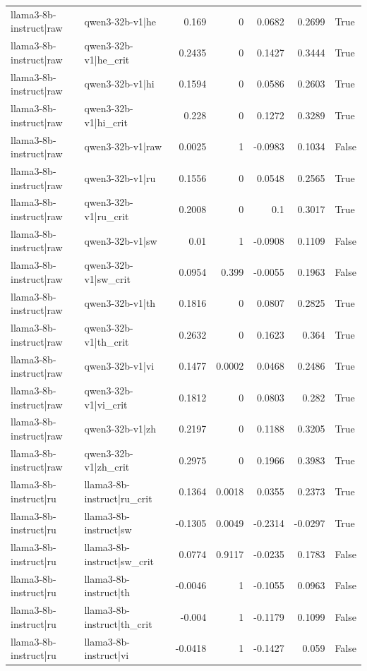\begin{table}
\begin{tabular}{l l r r r r l}
llama3-8b-instruct|raw & qwen3-32b-v1|he & 0.169 & 0 & 0.0682 & 0.2699 & True \\
llama3-8b-instruct|raw & qwen3-32b-v1|he_crit & 0.2435 & 0 & 0.1427 & 0.3444 & True \\
llama3-8b-instruct|raw & qwen3-32b-v1|hi & 0.1594 & 0 & 0.0586 & 0.2603 & True \\
llama3-8b-instruct|raw & qwen3-32b-v1|hi_crit & 0.228 & 0 & 0.1272 & 0.3289 & True \\
llama3-8b-instruct|raw & qwen3-32b-v1|raw & 0.0025 & 1 & -0.0983 & 0.1034 & False \\
llama3-8b-instruct|raw & qwen3-32b-v1|ru & 0.1556 & 0 & 0.0548 & 0.2565 & True \\
llama3-8b-instruct|raw & qwen3-32b-v1|ru_crit & 0.2008 & 0 & 0.1 & 0.3017 & True \\
llama3-8b-instruct|raw & qwen3-32b-v1|sw & 0.01 & 1 & -0.0908 & 0.1109 & False \\
llama3-8b-instruct|raw & qwen3-32b-v1|sw_crit & 0.0954 & 0.399 & -0.0055 & 0.1963 & False \\
llama3-8b-instruct|raw & qwen3-32b-v1|th & 0.1816 & 0 & 0.0807 & 0.2825 & True \\
llama3-8b-instruct|raw & qwen3-32b-v1|th_crit & 0.2632 & 0 & 0.1623 & 0.364 & True \\
llama3-8b-instruct|raw & qwen3-32b-v1|vi & 0.1477 & 0.0002 & 0.0468 & 0.2486 & True \\
llama3-8b-instruct|raw & qwen3-32b-v1|vi_crit & 0.1812 & 0 & 0.0803 & 0.282 & True \\
llama3-8b-instruct|raw & qwen3-32b-v1|zh & 0.2197 & 0 & 0.1188 & 0.3205 & True \\
llama3-8b-instruct|raw & qwen3-32b-v1|zh_crit & 0.2975 & 0 & 0.1966 & 0.3983 & True \\
llama3-8b-instruct|ru & llama3-8b-instruct|ru_crit & 0.1364 & 0.0018 & 0.0355 & 0.2373 & True \\
llama3-8b-instruct|ru & llama3-8b-instruct|sw & -0.1305 & 0.0049 & -0.2314 & -0.0297 & True \\
llama3-8b-instruct|ru & llama3-8b-instruct|sw_crit & 0.0774 & 0.9117 & -0.0235 & 0.1783 & False \\
llama3-8b-instruct|ru & llama3-8b-instruct|th & -0.0046 & 1 & -0.1055 & 0.0963 & False \\
llama3-8b-instruct|ru & llama3-8b-instruct|th_crit & -0.004 & 1 & -0.1179 & 0.1099 & False \\
llama3-8b-instruct|ru & llama3-8b-instruct|vi & -0.0418 & 1 & -0.1427 & 0.059 & False \\

\end{tabular}
\end{table}
